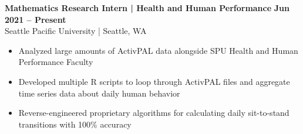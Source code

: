 \textbf{Mathematics Research Intern | Health and Human Performance} \hfill \textbf{Jun 2021 -- Present}\\
    Seattle Pacific University | Seattle, WA
    \squish
    \begin{itemize} \setlength\itemsep{-2pt}
        \item Analyzed large amounts of ActivPAL data alongside SPU Health and Human Performance Faculty
        \item Developed multiple R scripts to loop through ActivPAL files and aggregate time series data about daily human behavior
        \item Reverse-engineered proprietary algorithms for calculating daily sit-to-stand transitions with 100\% accuracy
    \end{itemize}